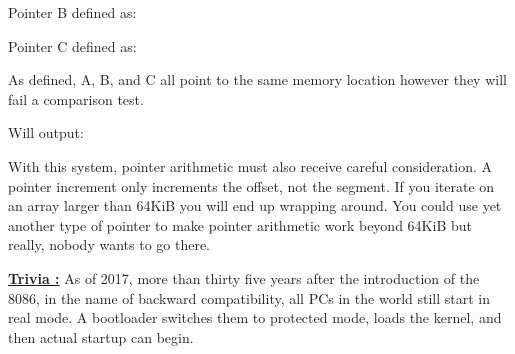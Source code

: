 \documentclass[book.tex]{subfiles}
\begin{document}
\bigskip

Pointer B defined as:\\
\par
\begin{minipage}{\textwidth}

\end{minipage}

\bigskip

Pointer C defined as:\\
\par
\begin{minipage}{\textwidth}

\end{minipage}

As defined, A, B, and C all point to the same memory location however they will fail a comparison test.\\

\begin{minipage}{\textwidth}

\end{minipage}
\par
Will output:\\

\begin{minipage}{\textwidth}

\end{minipage}
\par

With this system, pointer arithmetic must also receive careful consideration. A  pointer increment only increments the offset, not the segment. If you iterate on an array larger than 64KiB you will end up wrapping around. You could use yet another type of pointer  to make pointer arithmetic work beyond 64KiB but really, nobody wants to go there.\\


\par

\textbf{\underline{Trivia :}}  As of 2017, more than thirty five years after the introduction of the 8086, in the name of backward compatibility, all PCs in the world still start in real mode. A bootloader switches them to protected mode, loads the kernel, and then actual startup can begin.
\end{document}
